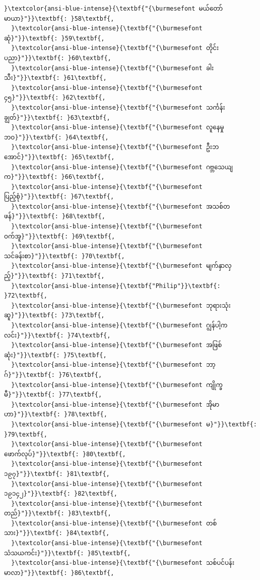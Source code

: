 \documentclass[11pt]{article}
\begin{document}
\begin{Verbatim}[commandchars=\\\{\}]
  }\textcolor{ansi-blue-intense}{\textbf{"{\burmesefont မယ်တော်မာယာ}"}}\textbf{: }58\textbf{,
  }\textcolor{ansi-blue-intense}{\textbf{"{\burmesefont ဆုံ}"}}\textbf{: }59\textbf{,
  }\textcolor{ansi-blue-intense}{\textbf{"{\burmesefont တိုင်းပညာ}"}}\textbf{: }60\textbf{,
  }\textcolor{ansi-blue-intense}{\textbf{"{\burmesefont ခါးသီး}"}}\textbf{: }61\textbf{,
  }\textcolor{ansi-blue-intense}{\textbf{"{\burmesefont ၄၅}"}}\textbf{: }62\textbf{,
  }\textcolor{ansi-blue-intense}{\textbf{"{\burmesefont သင်္ကန်းချွတ်}"}}\textbf{: }63\textbf{,
  }\textcolor{ansi-blue-intense}{\textbf{"{\burmesefont လူနေမှုဘဝ}"}}\textbf{: }64\textbf{,
  }\textcolor{ansi-blue-intense}{\textbf{"{\burmesefont ဦးဘအောင်}"}}\textbf{: }65\textbf{,
  }\textcolor{ansi-blue-intense}{\textbf{"{\burmesefont ဂဗ္ဘသေယျက}"}}\textbf{: }66\textbf{,
  }\textcolor{ansi-blue-intense}{\textbf{"{\burmesefont ပြည့်စုံ}"}}\textbf{: }67\textbf{,
  }\textcolor{ansi-blue-intense}{\textbf{"{\burmesefont အသစ်တဖန်}"}}\textbf{: }68\textbf{,
  }\textcolor{ansi-blue-intense}{\textbf{"{\burmesefont ဝက်အူ}"}}\textbf{: }69\textbf{,
  }\textcolor{ansi-blue-intense}{\textbf{"{\burmesefont သင်ခန်းစာ}"}}\textbf{: }70\textbf{,
  }\textcolor{ansi-blue-intense}{\textbf{"{\burmesefont မျက်နှာလှည့်}"}}\textbf{: }71\textbf{,
  }\textcolor{ansi-blue-intense}{\textbf{"Philip"}}\textbf{: }72\textbf{,
  }\textcolor{ansi-blue-intense}{\textbf{"{\burmesefont ဘုရားသုံးဆူ}"}}\textbf{: }73\textbf{,
  }\textcolor{ansi-blue-intense}{\textbf{"{\burmesefont ဂျွန်ပါ့ကလင်း}"}}\textbf{: }74\textbf{,
  }\textcolor{ansi-blue-intense}{\textbf{"{\burmesefont အဖြစ်ဆုံး}"}}\textbf{: }75\textbf{,
  }\textcolor{ansi-blue-intense}{\textbf{"{\burmesefont ဘာ့ဂ်}"}}\textbf{: }76\textbf{,
  }\textcolor{ansi-blue-intense}{\textbf{"{\burmesefont ကျိုက္ခမီ}"}}\textbf{: }77\textbf{,
  }\textcolor{ansi-blue-intense}{\textbf{"{\burmesefont အိုမာဟာ}"}}\textbf{: }78\textbf{,
  }\textcolor{ansi-blue-intense}{\textbf{"{\burmesefont မ}"}}\textbf{: }79\textbf{,
  }\textcolor{ansi-blue-intense}{\textbf{"{\burmesefont ဖောက်လုပ်}"}}\textbf{: }80\textbf{,
  }\textcolor{ansi-blue-intense}{\textbf{"{\burmesefont ၁၉၇}"}}\textbf{: }81\textbf{,
  }\textcolor{ansi-blue-intense}{\textbf{"{\burmesefont ၁၉၁၄၂}"}}\textbf{: }82\textbf{,
  }\textcolor{ansi-blue-intense}{\textbf{"{\burmesefont တည်}"}}\textbf{: }83\textbf{,
  }\textcolor{ansi-blue-intense}{\textbf{"{\burmesefont တစ်သား}"}}\textbf{: }84\textbf{,
  }\textcolor{ansi-blue-intense}{\textbf{"{\burmesefont သံသယကင်း}"}}\textbf{: }85\textbf{,
  }\textcolor{ansi-blue-intense}{\textbf{"{\burmesefont သစ်ပင်ပန်းမာလာ}"}}\textbf{: }86\textbf{,

\end{Verbatim}
\end{document}
